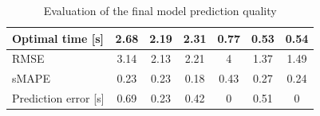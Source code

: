 \begin{table}[!htb]
\begin{tabular}{lcccccc}
\multicolumn{1}{|l|}{Optimal time {[}s{]}} & 2.68 & 2.19 & \multicolumn{1}{c|}{2.31} & 0.77 & 0.53 & \multicolumn{1}{c|}{0.54} \\ \hline
\multicolumn{1}{|l|}{RMSE} & 3.14 & 2.13 & \multicolumn{1}{c|}{2.21} & 4 & 1.37 & \multicolumn{1}{c|}{1.49} \\ \hline
\multicolumn{1}{|l|}{sMAPE} & 0.23 & 0.23 & \multicolumn{1}{c|}{0.18} & 0.43 & 0.27 & \multicolumn{1}{c|}{0.24} \\ \hline
\multicolumn{1}{|l|}{Prediction error {[}s{]}} & 0.69 & 0.23 & \multicolumn{1}{c|}{0.42} & 0 & 0.51 & \multicolumn{1}{c|}{0} \\ \hline
\end{tabular}
\caption{Evaluation of the final model prediction quality}
\label{tab:finalModelTest}
\end{table}

